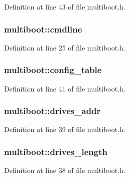 Definition at line 43 of file multiboot.h.

\hypertarget{structmultiboot_a03fba8bf57c8be9cada9047fdafdce8a}{
\subsubsection[{cmdline}]{ {\bf multiboot::cmdline}}}
\label{structmultiboot_a03fba8bf57c8be9cada9047fdafdce8a}


Definition at line 25 of file multiboot.h.

\hypertarget{structmultiboot_a056ae8e3fa3ea4bcda41fc12b8762098}{
\subsubsection[{config\_\-table}]{ {\bf multiboot::config\_\-table}}}
\label{structmultiboot_a056ae8e3fa3ea4bcda41fc12b8762098}


Definition at line 41 of file multiboot.h.

\hypertarget{structmultiboot_a4daf1390e1750652a62ef7df336a59a5}{
\subsubsection[{drives\_\-addr}]{ {\bf multiboot::drives\_\-addr}}}
\label{structmultiboot_a4daf1390e1750652a62ef7df336a59a5}


Definition at line 39 of file multiboot.h.

\hypertarget{structmultiboot_add7130fb22b4a2859f5f24346e18648b}{
\subsubsection[{drives\_\-length}]{ {\bf multiboot::drives\_\-length}}}
\label{structmultiboot_add7130fb22b4a2859f5f24346e18648b}


Definition at line 38 of file multiboot.h.

